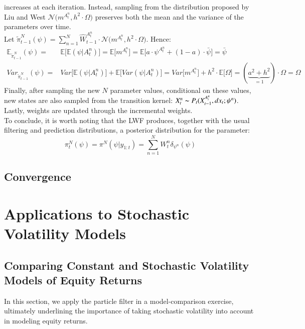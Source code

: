 \documentclass[
]{book}
\theoremstyle{break}
\theoremstyle{nonumberplain}
\begin{document}
increases at each iteration. Instead, sampling from the distribution
proposed by Liu and West
\(\mathcal N\big(m^{A_t^n},h^2\cdot \Omega\big)\) preserves both the
mean and the variance of the parameters over time.\\
Let
\(\tilde \pi_{t-1}^N(\psi)=\sum_{n=1}^N \hat W_{t-1}^{A_t^{n}}\cdot \mathcal N\big(m^{A_t^n},h^2\cdot \Omega\big)\).
Hence: \begin{equation*}
    \begin{split}
        \mathbb E_{\tilde \pi_{t-1}^N} ( \psi)=& \mathbb E\big[\mathbb E( \psi|A_t^{n})\big]=\mathbb E\big[m^{A_t^n}\big]=\mathbb E\big[a\cdot \psi^{A_t^n}+(1-a)\cdot \bar \psi\big]=\bar \psi\\
        Var_{\tilde \pi_{t-1}^N} ( \psi)=&Var\big[\mathbb E( \psi|A_t^{n})\big]+\mathbb E\big[Var( \psi|A_t^{n})\big]=Var\big[m^{A_t^n}\big]+h^2\cdot\mathbb E\big[\Omega\big]=(\underbrace{a^2+h^2}_{=1})\cdot \Omega =\Omega
    \end{split}
\end{equation*} Finally, after sampling the new \(N\) parameter values,
conditional on these values, new states are also sampled from the
transition kernel: \(X_t^n\thicksim P_t(X_{t-1}^{A_t^n},dx_t; \psi^n)\).
Lastly, weights are updated through the incremental weights.~\\
To conclude, it is worth noting that the LWF produces, together with the
usual filtering and prediction distributions, a posterior distribution
for the parameter: \begin{equation}
    \pi^N_{t}(\psi)=\pi^N(\psi|y_{1:t})=\sum_{n=1}^NW_{t}^n\delta_{\psi^n}(\psi)
\end{equation}

\section{Convergence}\label{pf_converg}

\chapter{Applications to Stochastic Volatility Models}
\section{Comparing Constant and Stochastic Volatility Models of Equity Returns}

In this section, we apply the particle filter in a model-comparison
exercise, ultimately underlining the importance of taking stochastic
volatility into account in modeling equity returns.
\end{document}
